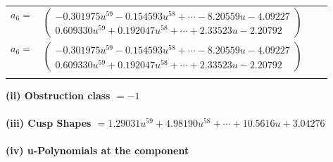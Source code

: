 \documentclass[1p]{elsarticle_modified}
\theoremstyle{definition}
\begin{document}
\begin{tabular}{m{7pt} m{180pt} m{7pt} m{180pt} }
\flushright $a_{6}=$&$\begin{pmatrix}-0.301975 u^{59}-0.154593 u^{58}+\cdots-8.20559 u-4.09227\\0.609330 u^{59}+0.192047 u^{58}+\cdots+2.33523 u-2.20792\end{pmatrix}$\\ \flushright $a_{6}=$&$\begin{pmatrix}-0.301975 u^{59}-0.154593 u^{58}+\cdots-8.20559 u-4.09227\\0.609330 u^{59}+0.192047 u^{58}+\cdots+2.33523 u-2.20792\end{pmatrix}$\\&\end{tabular}
\flushleft \textbf{(ii) Obstruction class $= -1$}\\~\\
\flushleft \textbf{(iii) Cusp Shapes $= 1.29031 u^{59}+4.98190 u^{58}+\cdots+10.5616 u+3.04276$}\\~\\
\newpage\renewcommand{\arraystretch}{1}
\flushleft \textbf{(iv) u-Polynomials at the component}\newline \\
\end{document}
